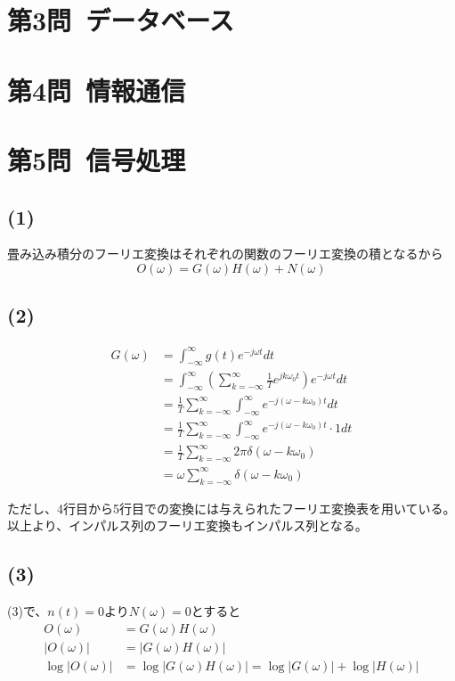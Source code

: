 \documentclass[a4paper,12pt,xelatex,ja=standard]{bxjsarticle}
\begin{document}
\section*{第3問\ データベース}

\section*{第4問\ 情報通信}

\section*{第5問\ 信号処理}
\subsection*{(1)}
畳み込み積分のフーリエ変換はそれぞれの関数のフーリエ変換の積となるから
\[
  O(\omega) = G(\omega)H(\omega) + N(\omega)
\]

\subsection*{(2)}
\begin{equation*}
  \begin{split}
    G(\omega)
      &= \int^{\infty}_{-\infty} g(t) e^{-j \omega t} dt \\
      &= \int^{\infty}_{-\infty} \left( \sum^{\infty}_{k = - \infty} \frac{1}{T} e^{j k \omega_0 t} \right)e^{-j \omega t} dt \\
      &= \frac{1}{T} \sum^{\infty}_{k = - \infty} \int^{\infty}_{-\infty} e^{-j(\omega -k\omega_0)t} dt \\
      &= \frac{1}{T} \sum^{\infty}_{k = - \infty} \int^{\infty}_{-\infty} e^{-j(\omega -k\omega_0)t} \cdot 1 dt \\
      &= \frac{1}{T} \sum^{\infty}_{k = - \infty} 2 \pi \delta(\omega - k \omega_0) \\
      &= \omega \sum^{\infty}_{k = - \infty} \delta(\omega - k \omega_0)
  \end{split}
\end{equation*}

ただし、4行目から5行目での変換には与えられたフーリエ変換表を用いている。
以上より、インパルス列のフーリエ変換もインパルス列となる。

\subsection*{(3)}
(3)で、$n(t) = 0$より$N(\omega) = 0$とすると
\begin{equation*}
  \begin{split}
    O(\omega) &= G(\omega) H(\omega) \\
    |O(\omega)| &= |G(\omega) H(\omega)| \\
    \log |O(\omega)| &= \log |G(\omega) H(\omega)| = \log |G(\omega)| + \log |H(\omega)| \\
  \end{split}
\end{equation*}
\end{document}

